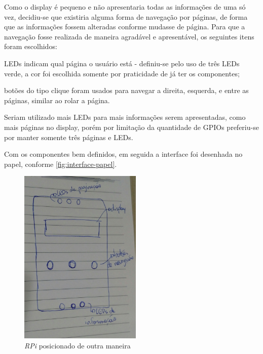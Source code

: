 \documentclass[
		12pt,				%
		openright,			%
		oneside,			%
		a4paper,			%
		chapter=TITLE,		%
		english,			%
		brazil				%
	]{abntex2}
\begin{document}
Como o display é pequeno e não apresentaria todas as informações de uma só vez, decidiu-se que existiria alguma forma de navegação por páginas, de forma que as informações fossem alteradas conforme mudasse de página. Para que a navegação fosse realizada de maneira agradável e apresentável, os seguintes itens foram escolhidos:

\begin{alineas}
	\item LEDs indicam qual página o usuário está - definiu-se pelo uso de três LEDs verde, a cor foi escolhida somente por praticidade de já ter os componentes;
	\item botões do tipo clique foram usados para navegar a direita, esquerda, e entre as páginas, similar ao rolar a página.
\end{alineas}

Seriam utilizado mais LEDs para mais informações serem apresentadas, como mais páginas no display, porém por limitação da quantidade de GPIOs preferiu-se por manter somente três páginas e LEDs.

Com os componentes bem definidos, em seguida a interface foi desenhada no papel, conforme \autoref{fig:interface-papel}.

\begin{figure}[htb]
	\caption{\label{fig:interface-papel}\textit{RPi} posicionado de outra maneira}
	\begin{center}
		\includegraphics[width=0.52\textwidth]{img/interface-papel.jpg}
	\end{center}
\end{figure}
\end{document}
